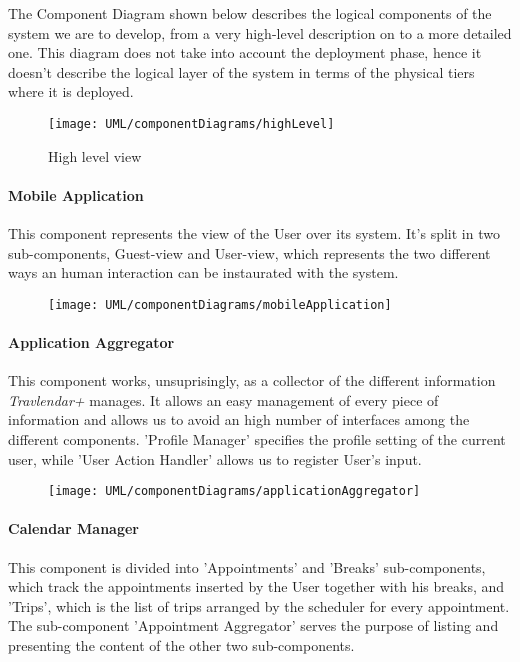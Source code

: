 The Component Diagram shown below describes the logical components of the system we are to develop, from a very high-level description on to a more detailed one. This diagram does not take into account the deployment phase, hence it doesn’t describe the logical layer of the system in terms of the physical tiers where it is deployed.

\begin{figure}[H]
		\centering
		\texttt{[image: UML/componentDiagrams/highLevel]}
		\caption{High level view}
		\label{componentHighLevel}
	\end{figure}

\paragraph{Mobile Application}
	This component represents the view of the User over its system. It’s split in two sub-components, Guest-view and User-view, which represents the two different ways an human interaction can be instaurated with the system.

	\begin{figure}[H]
		\centering
		\texttt{[image: UML/componentDiagrams/mobileApplication]}
	\end{figure}


\paragraph{Application Aggregator}
	This component works, unsuprisingly, as a collector of the different information \textit{Travlendar+} manages. It allows an easy management of every piece of information and allows us to avoid an high number of interfaces among the different components. 'Profile Manager' specifies the profile setting of the current user, while 'User Action Handler' allows us to register User's input.
	
	\begin{figure}[H]
		\centering
		\texttt{[image: UML/componentDiagrams/applicationAggregator]}
	\end{figure}
 
\paragraph{Calendar Manager}
	This component is divided into 'Appointments' and 'Breaks' sub-components, which track the appointments inserted by the User together with his breaks, and 'Trips', which is the list of trips arranged by the scheduler for every appointment. The sub-component 'Appointment Aggregator' serves the purpose of listing and presenting the content of the other two sub-components.
	

